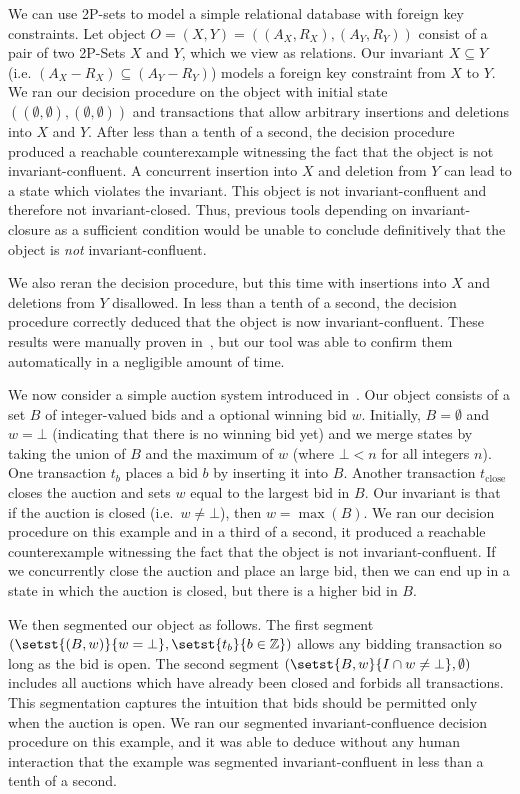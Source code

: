 We can use 2P-sets to model a simple relational database with foreign key
constraints. Let object $O = (X, Y) = ((A_X, R_X), (A_Y, R_Y))$ consist of a
pair of two 2P-Sets $X$ and $Y$, which we view as relations. Our invariant $X
\subseteq Y$ (i.e. $(A_X - R_X) \subseteq (A_Y - R_Y)$) models a foreign key
constraint from $X$ to $Y$. We ran our decision procedure on the object with
initial state $((\emptyset, \emptyset), (\emptyset, \emptyset))$ and
transactions that allow arbitrary insertions and deletions into $X$ and $Y$.
After less than a tenth of a second, the decision procedure produced a
reachable counterexample witnessing the fact that the object is not
invariant-confluent. A concurrent insertion into $X$ and deletion from $Y$ can
lead to a state which violates the invariant. This object is not
invariant-confluent and therefore not invariant-closed. Thus, previous tools
depending on invariant-closure as a sufficient condition would be unable to
conclude definitively that the object is \emph{not} invariant-confluent.

We also reran the decision procedure, but this time with insertions into $X$
and deletions from $Y$ disallowed. In less than a tenth of a second, the
decision procedure correctly deduced that the object is now
invariant-confluent. These results were manually proven
in~\cite{bailis2014coordination}, but our tool was able to confirm them
automatically in a negligible amount of time.

\example[Auction]
We now consider a simple auction system introduced in~\cite{gotsman2016cause}.
Our object consists of a set $B$ of integer-valued bids and a optional winning
bid $w$. Initially, $B = \emptyset$ and $w = \bot$ (indicating that there is no
winning bid yet) and we merge states by taking the union of $B$ and the maximum
of $w$ (where $\bot < n$ for all integers $n$). One transaction $t_b$ places a bid
$b$ by inserting it into $B$. Another transaction $t_\text{close}$ closes the
auction and sets $w$ equal to the largest bid in $B$. Our invariant is that if
the auction is closed (i.e.\ $w \neq \bot$), then $w = \max(B)$. We ran our
decision procedure on this example and in a third of a second, it produced a
reachable counterexample witnessing the fact that the object is not
invariant-confluent.  If we concurrently close the auction and place an large
bid, then we can end up in a state in which the auction is closed, but there is
a higher bid in $B$.

We then segmented our object as follows. The first segment $(\setst{(B, w)}{w =
\bot}, \setst{t_b}{b \in \ints})$ allows any bidding transaction so long as the
bid is open. The second segment $(\setst{B, w}{I \cap w \neq \bot}, \emptyset)$
includes all auctions which have already been closed and forbids all
transactions. This segmentation captures the intuition that bids should be
permitted only when the auction is open. We ran our segmented
invariant-confluence decision procedure on this example, and it was able to
deduce without any human interaction that the example was segmented
invariant-confluent in less than a tenth of a second.

